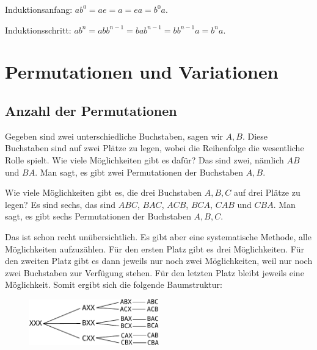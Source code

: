 Induktionsanfang: $ab^0 = ae = a = ea = b^0a$.

Induktionsschritt:
$ab^n = abb^{n-1} = bab^{n-1} = bb^{n-1}a = b^na$.\;\qedsymbol

\newpage
\section{Permutationen und Variationen}%

\subsection{Anzahl der Permutationen}

Gegeben sind zwei unterschiedliche Buchstaben, sagen wir $A,B$. Diese
Buchstaben sind auf zwei Plätze zu legen, wobei die Reihenfolge die
wesentliche Rolle spielt. Wie viele Möglichkeiten gibt es dafür?
Das sind zwei, nämlich $AB$ und $BA$. Man sagt, es gibt zwei
Permutationen der Buchstaben $A,B$.

Wie viele Möglichkeiten gibt es, die drei Buchstaben $A,B,C$ auf
drei Plätze zu legen? Es sind sechs, das sind
$ABC$, $BAC$, $ACB$, $BCA$, $CAB$ und $CBA$. Man sagt, es gibt
sechs Permutationen der Buchstaben $A,B,C$.

Das ist schon recht unübersichtlich. Es gibt aber eine systematische
Methode, alle Möglichkeiten aufzuzählen. Für den ersten Platz gibt
es drei Möglichkeiten. Für den zweiten Platz gibt es dann jeweils
nur noch zwei Möglichkeiten, weil nur noch zwei Buchstaben zur
Verfügung stehen. Für den letzten Platz bleibt jeweils eine
Möglichkeit. Somit ergibt sich die folgende Baumstruktur:

\begin{figure}[h]
\begin{center}
\includegraphics[width=0.5\textwidth]{img/Perm-ABC.pdf}
\end{center}
\end{figure}

